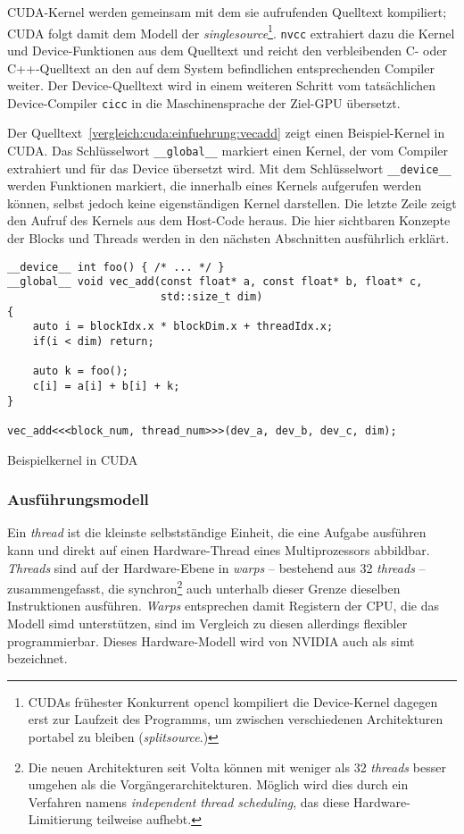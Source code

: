CUDA-Kernel werden gemeinsam mit dem sie aufrufenden Quelltext kompiliert; CUDA
folgt damit dem Modell der \textit{\gls{singlesource}}\footnote{CUDAs frühester
Konkurrent \gls{opencl} kompiliert die Device-Kernel dagegen erst zur Laufzeit
des Programms, um zwischen verschiedenen Architekturen portabel zu bleiben
(\textit{\gls{splitsource}}.)}. \texttt{nvcc} extrahiert dazu die Kernel und
Device-Funktionen aus dem Quelltext und reicht den verbleibenden C- oder
C++-Quelltext an den auf dem System befindlichen entsprechenden Compiler
weiter. Der Device-Quelltext wird in einem weiteren Schritt vom tatsächlichen
Device-Compiler \texttt{cicc} in die Maschinensprache der Ziel-GPU übersetzt.

Der Quelltext~\ref{vergleich:cuda:einfuehrung:vecadd} zeigt einen
Beispiel-Kernel in CUDA. Das Schlüsselwort \texttt{\_\_global\_\_} markiert
einen Kernel, der vom Compiler extrahiert und für das Device übersetzt wird. Mit
dem Schlüsselwort \texttt{\_\_device\_\_} werden Funktionen markiert, die
innerhalb eines Kernels aufgerufen werden können, selbst jedoch keine
eigenständigen Kernel darstellen. Die letzte Zeile zeigt den Aufruf des Kernels
aus dem Host-Code heraus. Die hier sichtbaren Konzepte der Blocks und Threads
werden in den nächsten Abschnitten ausführlich erklärt.

\begin{code}
    \begin{verbatim}
__device__ int foo() { /* ... */ }
__global__ void vec_add(const float* a, const float* b, float* c,
                        std::size_t dim)
{
    auto i = blockIdx.x * blockDim.x + threadIdx.x;
    if(i < dim) return;

    auto k = foo();
    c[i] = a[i] + b[i] + k;
}

vec_add<<<block_num, thread_num>>>(dev_a, dev_b, dev_c, dim);
    \end{verbatim}
    \caption{Beispielkernel in CUDA}
    \label{vergleich:cuda:einfuehrung:vecadd}
\end{code}


\subsubsection{Ausführungsmodell}

Ein \textit{thread} ist die kleinste selbstständige Einheit, die eine Aufgabe
ausführen kann und direkt auf einen Hardware-Thread eines Multiprozessors
abbildbar. \textit{Threads} sind auf der Hardware-Ebene in \textit{warps}
 -- bestehend aus 32 \textit{threads} -- zusammengefasst, die
 synchron\footnote{Die neuen
Architekturen seit Volta können mit weniger als 32 \textit{threads} besser
umgehen als die Vorgängerarchitekturen. Möglich wird dies durch ein Verfahren
namens \textit{independent thread scheduling}, das diese Hardware-Limitierung
teilweise aufhebt.} auch unterhalb dieser Grenze dieselben Instruktionen
ausführen. \textit{Warps} entsprechen damit Registern der CPU, die das Modell
\gls{simd} unterstützen, sind im Vergleich zu diesen allerdings flexibler
programmierbar. Dieses Hardware-Modell wird von NVIDIA auch als \gls{simt}
bezeichnet.

